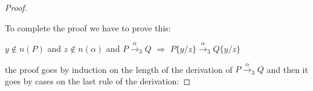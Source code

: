 \begin{theorem}
\begin{proof}
\begin{description}
    \end{description}
    To complete the proof we have to prove this:
    \begin{center}
      $y\notin n(P)$ and 
      $z\notin n(\alpha)$ and 
      $P\xrightarrow{\alpha}_{3}Q$ $\Rightarrow$ $P\{y/z\}\xrightarrow{\alpha}_{3}Q\{y/z\}$
    \end{center}
    the proof goes by induction on the length of the derivation of $P\xrightarrow{\alpha}_{3}Q$ and then it goes by cases on the last rule of the derivation:
% 
% 
% 
% 
% 

\end{proof}
\end{theorem}
